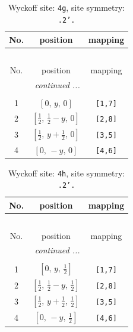 \documentclass[fleqn,8pt]{jsarticle}
\begin{document}
\renewcommand{\arraystretch}{1.2}
\begin{longtable}{ccc}
\caption{Wyckoff site: {\tt 4g}, site symmetry: {\tt .2'.}}
 \\
 \hline \hline
No. & position & mapping \\ \hline \endfirsthead

\multicolumn{2}{l}{\tablename\ \thetable{}} \\
 \hline \hline
No. & position & mapping \\ \hline \endhead

 \hline \hline
\multicolumn{2}{r}{\footnotesize\it continued ...} \\ \endfoot

 \hline \hline
\multicolumn{2}{r}{} \\ \endlastfoot

1 & $\left[ 0,\, y,\, 0 \right]$ & {\tt [1,7]} \\ \hline
2 & $\left[ \frac{1}{2},\, \frac{1}{2} - y,\, 0 \right]$ & {\tt [2,8]} \\ \hline
3 & $\left[ \frac{1}{2},\, y + \frac{1}{2},\, 0 \right]$ & {\tt [3,5]} \\ \hline
4 & $\left[ 0,\, - y,\, 0 \right]$ & {\tt [4,6]} \\
\end{longtable}
\renewcommand{\arraystretch}{1.2}
\begin{longtable}{ccc}
\caption{Wyckoff site: {\tt 4h}, site symmetry: {\tt .2'.}}
 \\
 \hline \hline
No. & position & mapping \\ \hline \endfirsthead

\multicolumn{2}{l}{\tablename\ \thetable{}} \\
 \hline \hline
No. & position & mapping \\ \hline \endhead

 \hline \hline
\multicolumn{2}{r}{\footnotesize\it continued ...} \\ \endfoot

 \hline \hline
\multicolumn{2}{r}{} \\ \endlastfoot

1 & $\left[ 0,\, y,\, \frac{1}{2} \right]$ & {\tt [1,7]} \\ \hline
2 & $\left[ \frac{1}{2},\, \frac{1}{2} - y,\, \frac{1}{2} \right]$ & {\tt [2,8]} \\ \hline
3 & $\left[ \frac{1}{2},\, y + \frac{1}{2},\, \frac{1}{2} \right]$ & {\tt [3,5]} \\ \hline
4 & $\left[ 0,\, - y,\, \frac{1}{2} \right]$ & {\tt [4,6]} \\
\end{longtable}
\end{document}
